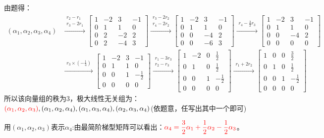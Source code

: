 \documentclass{article}
\begin{document}
\begin{jie}
由题得：
\begin{align*}
(\alpha_1,\alpha_2,\alpha_3,\alpha_4)&
\xrightarrow{\substack{ r_2-r_1 \\ r_3-2r_1 }}
{
\begin{bmatrix}
  1 & -2& 3&-1 \\
  0 & 1 & 1 &0\\
  0 &2&-2&2\\
  0&2&-4&3
\end{bmatrix}
}\xrightarrow{\substack{ r_3-2r_2 \\ r_4-2r_2 }}
{
\begin{bmatrix}
  1 & -2& 3&-1 \\
  0 & 1 & 1 &0\\
  0 &0&-4&2\\
  0&0&-6&3
\end{bmatrix}
}\xrightarrow{\substack{ r_4-\frac{3}{2}r_3 }}
{
\begin{bmatrix}
  1 & -2& 3&-1 \\
  0 & 1 & 1 &0\\
  0 &0&-4&2\\
  0&0&0&0
\end{bmatrix}
}\\
&\xrightarrow{\substack{ r_3\times\left(-\frac{1}{4}\right) }}
{
\begin{bmatrix}
  1 & -2& 3&-1 \\
  0 & 1 & 1 &0\\
  0 &0&1&-\frac{1}{2}\\
  0&0&0&0
\end{bmatrix}
}\xrightarrow{\substack{ r_1-3r_3\\ r_2-r_3}}
{
\begin{bmatrix}
  1 & -2& 0&\frac{1}{2} \\
  0 & 1 & 0 &\frac{1}{2}\\
  0 &0&1&-\frac{1}{2}\\
  0&0&0&0
\end{bmatrix}
}\xrightarrow{\substack{ r_1+2r_2}}
{
\begin{bmatrix}
  1 & 0& 0&\frac{3}{2} \\
  0 & 1 & 0 &\frac{1}{2}\\
  0 &0&1&-\frac{1}{2}\\
  0&0&0&0
\end{bmatrix}
}
\end{align*}
所以该向量组的秩为\textcolor[rgb]{1.00,0.00,0.00}{3}，极大线性无关组为：$\textcolor[rgb]{1.00,0.00,0.00}{(\alpha_1,\alpha_2,\alpha_3)},(\alpha_1,\alpha_2,\alpha_4),(\alpha_1,\alpha_3,\alpha_4),(\alpha_2,\alpha_3,\alpha_4) $(依题意，任写出其中一个即可)

用$(\alpha_1,\alpha_2,\alpha_3)$表示$\alpha_4$:由最简阶梯型矩阵可以看出：$\textcolor[rgb]{1.00,0.00,0.00}{\alpha_4=\dfrac{3} {2}\alpha_1+\dfrac{1}{2}\alpha_2-\dfrac{1}{2}\alpha_3}$。
\end{jie}
\end{document}
